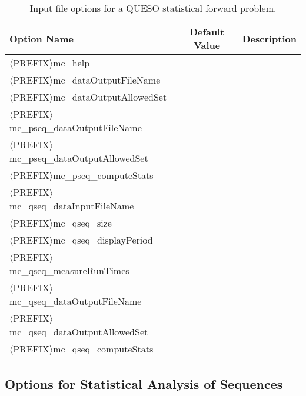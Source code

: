 \begin{table}[htpb]
\begin{center}
\caption{Input file options for a QUESO statistical forward problem.}
\ttfamily
\begin{tabular}{|l|c|c|}
\toprule
\rmfamily Option Name     & \rmfamily Default Value &  \rmfamily Description \\
\midrule\midrule
$\langle$PREFIX$\rangle$mc\_help                        &         &             \\
$\langle$PREFIX$\rangle$mc\_dataOutputFileName          &         &             \\
$\langle$PREFIX$\rangle$mc\_dataOutputAllowedSet        &         &             \\
$\langle$PREFIX$\rangle$mc\_pseq\_dataOutputFileName     &         &             \\
$\langle$PREFIX$\rangle$mc\_pseq\_dataOutputAllowedSet   &         &             \\
$\langle$PREFIX$\rangle$mc\_pseq\_computeStats           &         &             \\
$\langle$PREFIX$\rangle$mc\_qseq\_dataInputFileName      &         &             \\
$\langle$PREFIX$\rangle$mc\_qseq\_size                   &         &             \\
$\langle$PREFIX$\rangle$mc\_qseq\_displayPeriod          &         &             \\
$\langle$PREFIX$\rangle$mc\_qseq\_measureRunTimes        &         &             \\
$\langle$PREFIX$\rangle$mc\_qseq\_dataOutputFileName     &         &             \\
$\langle$PREFIX$\rangle$mc\_qseq\_dataOutputAllowedSet   &         &             \\
$\langle$PREFIX$\rangle$mc\_qseq\_computeStats           &         &             \\
\bottomrule
\end{tabular}
\end{center}
\label{tab-monte-carlo-options}
\end{table}

\subsection{Options for Statistical Analysis of Sequences}

